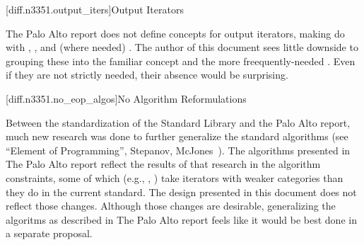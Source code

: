 [diff.n3351.output_iters]{Output Iterators}

\pnum
The Palo Alto report does not define concepts for output iterators, making do with
, , and (where needed) . The
author of this document sees little downside to grouping these into the familiar
 concept and the more freequently-needed . Even
if they are not strictly needed, their absence would be surprising.

[diff.n3351.no_eop_algos]{No Algorithm Reformulations}

\pnum
Between the standardization of the Standard Library and the Palo Alto report, much new research was
done to further generalize the standard algorithms
(see ``Element of Programming'', Stepanov, McJones~\cite{Stepanov:2009:EP:1614221}). The algorithms
presented in The Palo Alto report reflect the results of that research in the algorithm constraints,
some of which (e.g., , ) take iterators with weaker categories than
they do in the current standard. The design presented in this document does not reflect those
changes. Although those changes are desirable, generalizing the algoritms as described in The Palo
Alto report feels like it would be best done in a separate proposal.
